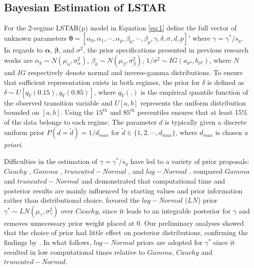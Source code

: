 \subsection{Bayesian Estimation of LSTAR}
 For the 2-regime LSTAR(p) model in Equation \ref{eq:1} define the full vector of unknown parameters $\bm{\theta}=[\alpha_0, \alpha_1, \cdots, \alpha_p, \beta_0,\cdots,\beta_p, \gamma,\delta,\sigma,d,p]'$ where $\gamma=\gamma^*/s_y$. In regards to $\bm{\alpha}$, $\bm{\beta}$, and $\sigma^2$, the prior specifications presented in previous research works are  $\alpha_k \sim N(\mu_\alpha,\sigma^2_\alpha)$, $\beta_k \sim N(\mu_\beta,\sigma^2_\beta)$, $1/\sigma^2 \sim IG(a_{\sigma^2},b_{\sigma^2})$, where $N$ and $IG$ respectively denote normal and inverse-gamma distributions. To ensure that sufficient representation exists in both regimes, the prior for $\delta$ is defined as $\delta \sim U[q_Y(0.15),q_Y(0.85)]$, where $q_Y(.)$ is the empirical quantile function of the observed transition variable and $U[a,b]$ represents the uniform distribution bounded on  $[a,b]$. Using the $15^{th}$ and $85^{th}$ percentiles ensures that at least 15\% of the data belongs to each regime. The parameter $d$ is typically given a discrete uniform prior $P(d=\tilde{d})=1/d_{max} \textrm{ for } \tilde{d} \in \{1,2,\cdots,d_{max}\}$, where $d_{max}$ is chosen \textit{a priori}.
 
Difficulties in the estimation of $\gamma=\gamma^*/s_y$ have led to a variety of prior proposals: $Cauchy$ \citep{Lubrano2000},  $Gamma$ \citep{Lopes2006}, $truncated-Normal$ \citep{Livingston2017}, and $log-Normal$ \citep{Gerlach2008}.  \cite{Livingston2017} compared  $Gamma$ and $truncated-Normal$ and demonstrated that computational time and posterior results are mainly influenced by starting values and prior information rather than distributional choice. \cite{Gerlach2008} favored the $log-Normal$ ($LN$) prior $\gamma^* \sim LN(\mu_\gamma,\sigma^2_\gamma)$ over $Cauchy$, since it leads to an integrable posterior for $\gamma$ and removes unnecessary prior weight placed at 0. Our preliminary analyses showed that the choice of prior had little effect on posterior distributions, confirming the findings by \cite{Livingston2017}. In what follows, $log-Normal$ priors are adopted for $\gamma^*$ since it resulted in low computational times relative to $Gamma$, $Cauchy$ and $truncated-Normal$.
 
